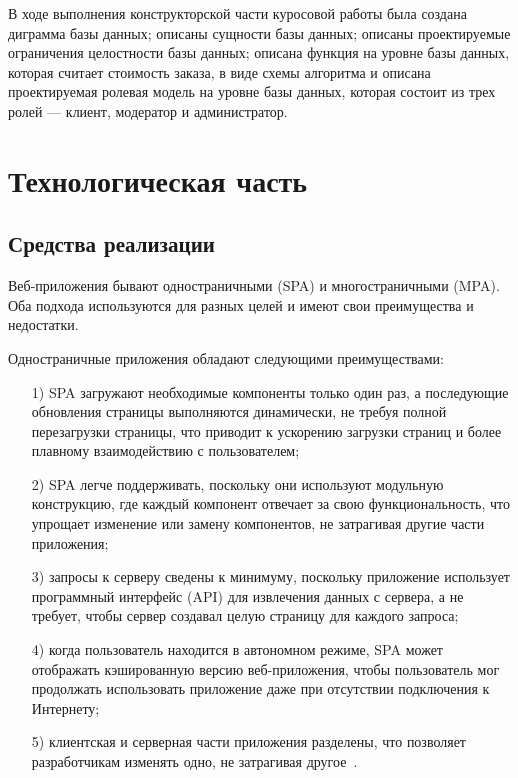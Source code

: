 \documentclass{bmstu}
\begin{document}
В ходе выполнения конструкторской части куросовой работы была создана диграмма базы данных; описаны сущности базы данных; описаны проектируемые ограничения целостности базы данных; описана функция на уровне базы данных, которая считает стоимость заказа, в виде схемы алгоритма и описана проектируемая ролевая модель на уровне базы данных, которая состоит из трех ролей --- клиент, модератор и администратор.

\chapter{Технологическая часть}

\section{Средства реализации}

Веб-приложения бывают одностраничными (SPA) и многостраничными (MPA). 
Оба подхода используются для разных целей и имеют свои преимущества и недостатки.

Одностраничные приложения обладают следующими преимуществами:

\begin{enumerate}
\item[1)] SPA загружают необходимые компоненты только один раз, а последующие обновления страницы выполняются динамически, не требуя полной перезагрузки страницы, что приводит к ускорению загрузки страниц и более плавному взаимодействию с пользователем;
\item[2)] SPA легче поддерживать, поскольку они используют модульную конструкцию, где каждый компонент отвечает за свою функциональность, что упрощает изменение или замену компонентов, не затрагивая другие части приложения;
\item[3)] запросы к серверу сведены к минимуму, поскольку приложение использует программный интерфейс (API) для извлечения данных с сервера, а не требует, чтобы сервер создавал целую страницу для каждого запроса;
\item[4)] когда пользователь находится в автономном режиме, SPA может отображать кэшированную версию веб-приложения, чтобы пользователь мог продолжать использовать приложение даже при отсутствии подключения к Интернету;
\item[5)] клиентская и серверная части приложения разделены, что позволяет разработчикам изменять одно, не затрагивая другое~\cite{Davidson2023}.
\end{enumerate}
\end{document}
